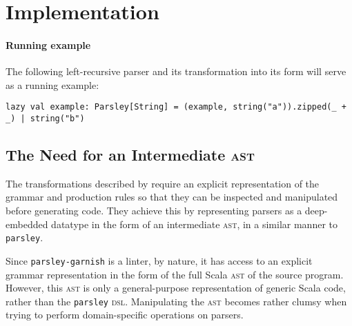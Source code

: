 \documentclass[../../main.tex]{subfiles}
\begin{document}
\label{sec:factor-leftrec}

\section{Implementation}

\paragraph{Running example}
The following left-recursive parser and its transformation into its  form will serve as a running example:
\begin{verbatim}
lazy val example: Parsley[String] = (example, string("a")).zipped(_ + _) | string("b")
\end{verbatim}

\subsection{The Need for an Intermediate \textsc{ast}}\label{sec:parser-ast-motivation}
The transformations described by \textcite{baars_leftrec_2004} require an explicit representation of the grammar and production rules so that they can be inspected and manipulated before generating code.
They achieve this by representing parsers as a deep-embedded datatype in the form of an intermediate \textsc{ast}, in a similar manner to \texttt{parsley}.

Since \texttt{parsley-garnish} is a linter, by nature, it has access to an explicit grammar representation in the form of the full Scala \textsc{ast} of the source program.
However, this \textsc{ast} is only a general-purpose representation of generic Scala code, rather than the \texttt{parsley} \textsc{dsl}.
Manipulating the \textsc{ast} becomes rather clumsy when trying to perform domain-specific operations on parsers.
\end{document}

